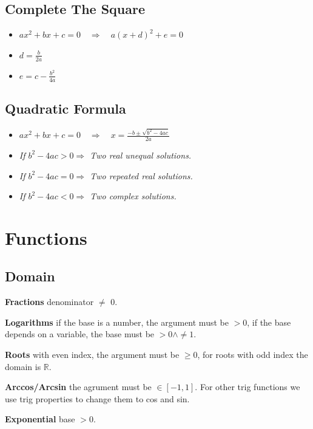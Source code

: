 \documentclass[8pt,a4paper]{extarticle}     %
\theoremstyle{definition}
\theoremstyle{definition}
\theoremstyle{definition}
\newcommand{\R}{\mathbb{R}}
\begin{document}
\begin{multicols}{4}
\subsection{Complete The Square}
\begin{itemize}[leftmargin=1em, label={·}]
	\item[] \boldmath $ax^2+bx+c = 0 \quad \Rightarrow \quad a(x+d)^2 + e = 0$ \unboldmath 
	\item $d = \frac{b}{2a}$
	\item $e = c - \frac{b^2}{4a}$
\end{itemize}

\subsection{Quadratic Formula}
\begin{itemize}[leftmargin=1em, label={·}]
	\item[] \boldmath $ax^2+bx+c = 0 \quad \Rightarrow \quad x = \frac{-b \pm \sqrt{b^2-4ac}}{2a}$ \unboldmath 
	\item \textit{If $b^2-4ac > 0 \Rightarrow$ Two real unequal solutions.}
	\item \textit{If $b^2-4ac = 0 \Rightarrow$ Two repeated real solutions.}
	\item \textit{If $b^2-4ac < 0 \Rightarrow$ Two complex solutions.}
\end{itemize}

\vfill\null
\columnbreak

\section{Functions}
\subsection{Domain}
\begin{bulletlist}
	\item \textbf{Fractions} denominator $\neq$ 0.
	\item \textbf{Logarithms} if the base is a number, the argument must be $> 0$, if the base depends on a variable, the base must be $> 0 \land \neq 1$.
	\item \textbf{Roots} with even index, the argument must be $\geq 0$, for roots with odd index the domain is $\R$.
	\item \textbf{Arccos/Arcsin} the agrument must be $\in [-1,1]$. For other trig functions we use trig properties to change them to cos and sin. 	
	\item \textbf{Exponential} base $> 0$.
\end{bulletlist}

\end{multicols}
\end{document}
